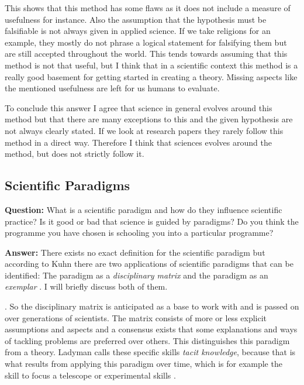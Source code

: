 \documentclass[11pt]{scrartcl}
\begin{document}
This shows that this method has some flaws as it does not include a measure of usefulness for instance. Also the assumption that the hypothesis must be falsifiable is not always given in applied science. If we take religions for an example, they mostly do not phrase a logical statement for falsifying them but are still accepted throughout the world. This tends towards assuming that  this method is not that useful, but I think that in a scientific context this method is a really good basement for getting started in creating a theory. Missing aspects like the mentioned usefulness are left for us humans to evaluate.

To conclude this answer I agree that science in general evolves around this method but that there are many exceptions to this and the given hypothesis are not always clearly stated. If we look at research papers they rarely follow this method in a direct way. Therefore I think that sciences evolves around the method, but does not strictly follow it.

\subsection{Scientific Paradigms}

\textbf{Question:} What is a scientific paradigm and how do they influence scientific practice? Is it good or bad that science is guided by paradigms? Do you think the programme you have chosen is schooling you into a particular programme?

\bigbreak

\textbf{Answer:} There exists no exact definition for the scientific paradigm but according to Kuhn there are two applications of scientific paradigms that can be identified: The paradigm as a \textit{disciplinary matrix} and the paradigm as an \textit{exemplar} \cite{ladyman}. I will briefly discuss both of them.

 \cite[p. 98]{ladyman}. So the disciplinary matrix is anticipated as a base to work with and is passed on over generations of scientists. The matrix consists of more or less explicit assumptions and aspects and a consensus exists that some explanations and ways of tackling problems are preferred over others. This distinguishes this paradigm from a theory. Ladyman calls these specific skills \textit{tacit knowledge}, because that is what results from applying this paradigm over time, which is for example the skill to focus a telescope or experimental skills \cite[p. 99]{ladyman}.
\end{document}
